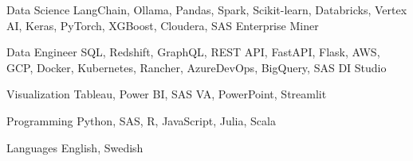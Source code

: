 

\begin{cvskills}

  \cvskill
    {Data Science} %
    {LangChain, Ollama, Pandas, Spark, Scikit-learn, Databricks, Vertex AI, Keras, PyTorch, XGBoost, Cloudera, SAS Enterprise Miner} %

  \cvskill
    {Data Engineer} %
    {SQL, Redshift, GraphQL, REST API, FastAPI, Flask, AWS, GCP, Docker, Kubernetes, Rancher, AzureDevOps, BigQuery, SAS DI Studio} %

  \cvskill
    {Visualization} %
    {Tableau, Power BI, SAS VA, PowerPoint, Streamlit} %

  \cvskill
    {Programming} %
    {Python, SAS, R, JavaScript, Julia, Scala} %

  \cvskill
    {Languages} %
    {English, Swedish} %

\end{cvskills}
